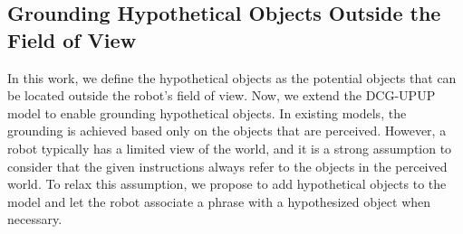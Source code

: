 %
%

\subsection{Grounding Hypothetical Objects Outside the Field of View}
In this work, we define the hypothetical objects as the potential objects that can be located outside the robot's field of view. Now, we extend the DCG-UPUP model to enable grounding hypothetical objects. In existing models, the grounding is achieved based only on the objects that are perceived. However, a robot typically has a limited view of the world, and it is a strong assumption to consider that the given instructions always refer to the objects in the perceived world. To relax this assumption, we propose to add hypothetical objects to the model and let the robot associate a phrase with a hypothesized object when necessary.   

